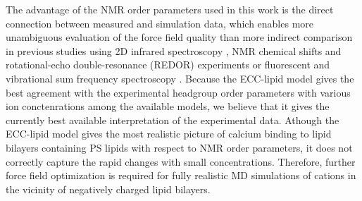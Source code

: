 \documentclass[journal=jpcbfk,manuscript=article]{achemso}
\begin{document}


The advantage of the NMR order parameters used in this work is the direct connection between
measured and simulation data, which enables more unambiguous evaluation of the force field quality \cite{catte16,ollila16}
than more indirect comparison in previous studies using 2D infrared spectroscopy \cite{valentine18}, NMR chemical shifts and
rotational-echo double-resonance (REDOR) experiments \cite{hallock18} or fluorescent and vibrational sum frequency spectroscopy \cite{melcrova16}.
Because the ECC-lipid model gives the best agreement with the experimental headgroup order parameters
with various ion conctenrations among the available models, we believe that it gives the currently best available
interpretation of the experimental data. Athough the ECC-lipid model gives the most realistic picture of calcium binding to
lipid bilayers containing PS lipids with respect to NMR order parameters, it does not
correctly capture the rapid changes with small concentrations. Therefore, further
force field optimization is required for fully realistic MD simulations of cations
in the vicinity of negatively charged lipid bilayers.


\end{document}
